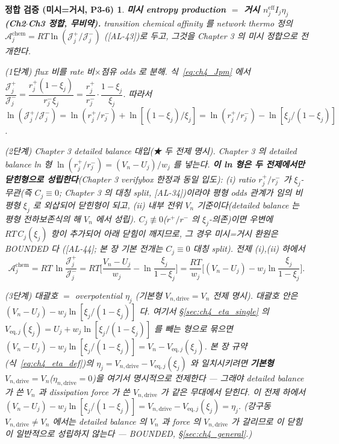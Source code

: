 \documentclass[11pt,a4paper]{article}
\newtheorem*{verifybox}{정합 검증 (미시=거시, P3-6)}
\newcommand{\eff}{\mathrm{eff}}
\newcommand{\eq}{\mathrm{eq}}
\newcommand{\drive}{\mathrm{drive}}
\newcommand{\chem}{\mathrm{chem}}
\newcommand{\AL}[1]{\textsf{[AL-#1]}}
\begin{document}
\begin{verifybox}
\textbf{미시 entropy production $=$ 거시 $n_j^{\eff}I_j\eta_j$ (Ch2$\cdot$Ch3 정합, 무비약).}
transition chemical affinity 를 network thermo 정의 $\mathcal A_j^{\chem}=RT\ln(\mathcal J_j^+/\mathcal J_j^-)$
(\AL{43})로 두고, 그것을 Chapter 3 의 미시 정합으로 전개한다.

\emph{(1단계) flux 비를 rate 비$\times$점유 odds 로 분해.} 식~\eqref{eq:ch4_Jpm} 에서
$\dfrac{\mathcal J_j^+}{\mathcal J_j^-}=\dfrac{r_j^+(1-\xi_j)}{r_j^-\xi_j}=\dfrac{r_j^+}{r_j^-}\cdot\dfrac{1-\xi_j}{\xi_j}$.
따라서 $\ln(\mathcal J_j^+/\mathcal J_j^-)=\ln(r_j^+/r_j^-)+\ln[(1-\xi_j)/\xi_j]=\ln(r_j^+/r_j^-)-\ln[\xi_j/(1-\xi_j)]$.

\emph{(2단계) Chapter 3 detailed balance 대입(★ 두 전제 명시).} Chapter 3 의 detailed balance ln 형
$\ln(r_j^+/r_j^-)=(V_n-U_j)/w_j$ 를 넣는다. \textbf{이 ln 형은 두 전제에서만 닫힌형으로 성립한다}(Chapter 3
verifybox 한정과 \emph{동일 입도}): (i) ratio $r_j^+/r_j^-$ 가 $\xi_j$\emph{-무관}(즉 $C_j\equiv0$; Chapter 3 의
대칭 split, \AL{34})이라야 \emph{평형} odds 관계가 임의 \emph{비평형} $\xi_j$ 로 외삽되어 닫힌형이 되고, (ii)
\emph{내부 전위} $V_n$ 기준이다(detailed balance 는 평형 전하보존식의 해 $V_n$ 에서 성립). $C_j\not\equiv0$($r^+/r^-$
의 $\xi_j$-의존)이면 우변에 $RT\,C_j(\xi_j)$ 항이 추가되어 아래 닫힘이 깨지므로, 그 경우 미시=거시 환원은 BOUNDED 다
(\AL{44}; 본 장 기본 전개는 $C_j\equiv0$ 대칭 split). 전제 (i),(ii) 하에서
\begin{equation}
\mathcal A_j^{\chem}=RT\,\ln\!\frac{\mathcal J_j^+}{\mathcal J_j^-}
=RT\Big[\frac{V_n-U_j}{w_j}-\ln\frac{\xi_j}{1-\xi_j}\Big]
=\frac{RT}{w_j}\Big[(V_n-U_j)-w_j\ln\frac{\xi_j}{1-\xi_j}\Big].
\label{eq:ch4_affinity_raw}
\end{equation}

\emph{(3단계) 대괄호 $=$ overpotential $\eta_j$ (기본형 $V_{n,\drive}=V_n$ 전제 명시).}
대괄호 안은 $(V_n-U_j)-w_j\ln[\xi_j/(1-\xi_j)]$ 다. 여기서 \S\ref{sec:ch4_eta_single} 의 $V_{\eq,j}(\xi_j)=U_j
+w_j\ln[\xi_j/(1-\xi_j)]$ 를 빼는 형으로 묶으면 $(V_n-U_j)-w_j\ln[\xi_j/(1-\xi_j)]=V_n-V_{\eq,j}(\xi_j)$. 본 장
규약(식~\eqref{eq:ch4_eta_def})의 $\eta_j=V_{n,\drive}-V_{\eq,j}(\xi_j)$ 와 일치시키려면 \textbf{기본형
$V_{n,\drive}=V_n$}($\eta_{n,\drive}=0$)을 \emph{여기서 명시적으로 전제}한다 — 그래야
detailed balance 가 쓴 $V_n$ 과 dissipation force 가 쓴 $V_{n,\drive}$ 가 같은 무대에서 닫힌다. 이 전제 하에서
$(V_n-U_j)-w_j\ln[\xi_j/(1-\xi_j)]=V_{n,\drive}-V_{\eq,j}(\xi_j)=\eta_j$. (강구동 $V_{n,\drive}\ne V_n$ 에서는
detailed balance 의 $V_n$ 과 force 의 $V_{n,\drive}$ 가 갈리므로 이 닫힘이 일반적으로 성립하지 않는다 —
BOUNDED, \S\ref{sec:ch4_general}.)


\end{verifybox}
\end{document}
